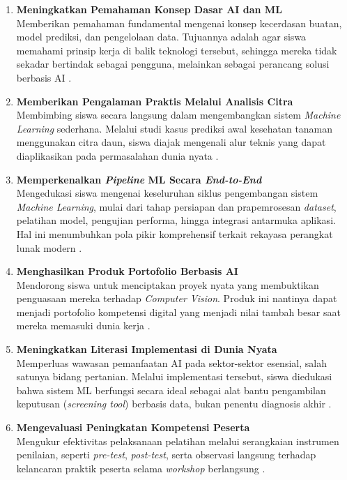 \begin{enumerate}
    \item \textbf{Meningkatkan Pemahaman Konsep Dasar AI dan ML}\\
    Memberikan pemahaman fundamental mengenai konsep kecerdasan buatan, model prediksi, dan pengelolaan data. Tujuannya adalah agar siswa memahami prinsip kerja di balik teknologi tersebut, sehingga mereka tidak sekadar bertindak sebagai pengguna, melainkan sebagai perancang solusi berbasis AI \parencite{TofanDwiTjahyono2025, Panjaitan2025}.

    \item \textbf{Memberikan Pengalaman Praktis Melalui Analisis Citra}\\
    Membimbing siswa secara langsung dalam mengembangkan sistem \textit{Machine Learning} sederhana. Melalui studi kasus prediksi awal kesehatan tanaman menggunakan citra daun, siswa diajak mengenali alur teknis yang dapat diaplikasikan pada permasalahan dunia nyata \parencite{Imanulloh2023}.

    \item \textbf{Memperkenalkan \textit{Pipeline} ML Secara \textit{End-to-End}}\\
    Mengedukasi siswa mengenai keseluruhan siklus pengembangan sistem \textit{Machine Learning}, mulai dari tahap persiapan dan prapemrosesan \textit{dataset}, pelatihan model, pengujian performa, hingga integrasi antarmuka aplikasi. Hal ini menumbuhkan pola pikir komprehensif terkait rekayasa perangkat lunak modern \parencite{Wibowo2026}.

    \item \textbf{Menghasilkan Produk Portofolio Berbasis AI}\\
    Mendorong siswa untuk menciptakan proyek nyata yang membuktikan penguasaan mereka terhadap \textit{Computer Vision}. Produk ini nantinya dapat menjadi portofolio kompetensi digital yang menjadi nilai tambah besar saat mereka memasuki dunia kerja \parencite{Ali2025}.

    \item \textbf{Meningkatkan Literasi Implementasi di Dunia Nyata}\\
    Memperluas wawasan pemanfaatan AI pada sektor-sektor esensial, salah satunya bidang pertanian. Melalui implementasi tersebut, siswa diedukasi bahwa sistem ML berfungsi secara ideal sebagai alat bantu pengambilan keputusan (\textit{screening tool}) berbasis data, bukan penentu diagnosis akhir \parencite{MarwanRamdhanyEdy2025}.

    \item \textbf{Mengevaluasi Peningkatan Kompetensi Peserta}\\
    Mengukur efektivitas pelaksanaan pelatihan melalui serangkaian instrumen penilaian, seperti \textit{pre-test}, \textit{post-test}, serta observasi langsung terhadap kelancaran praktik peserta selama \textit{workshop} berlangsung \parencite{Utomo2024}.
\end{enumerate}

